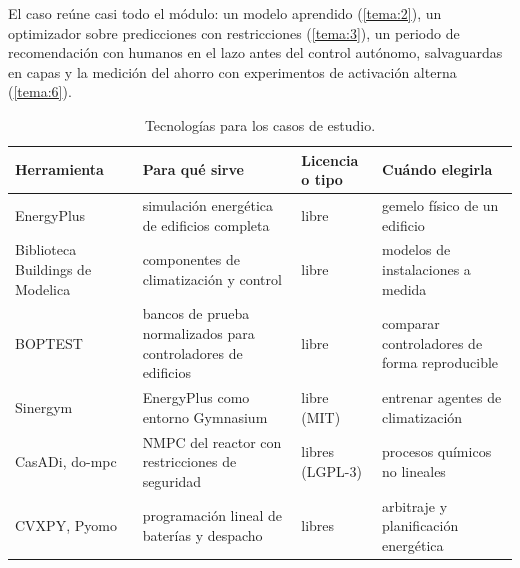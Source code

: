 El caso reúne casi todo el módulo: un modelo aprendido (\cref{tema:2}), un optimizador sobre predicciones con restricciones (\cref{tema:3}), un periodo de recomendación con humanos en el lazo antes del control autónomo, salvaguardas en capas y la medición del ahorro con experimentos de activación alterna (\cref{tema:6}).

\begin{table}[htbp]
\centering\footnotesize
\begin{tabularx}{\textwidth}{@{}>{\raggedright\arraybackslash}p{3.1cm}>{\raggedright\arraybackslash}X>{\raggedright\arraybackslash}p{2.0cm}>{\raggedright\arraybackslash}X@{}}
\toprule
Herramienta & Para qué sirve & Licencia o tipo & Cuándo elegirla \\
\midrule
EnergyPlus~\cite{crawley} & simulación energética de edificios completa & libre & gemelo físico de un edificio \\
Biblioteca Buildings de Modelica~\cite{modelica} & componentes de climatización y control & libre & modelos de instalaciones a medida \\
BOPTEST~\cite{boptest} & bancos de prueba normalizados para controladores de edificios & libre & comparar controladores de forma reproducible \\
Sinergym~\cite{sinergym} & EnergyPlus como entorno Gymnasium & libre (MIT) & entrenar agentes de climatización \\
CasADi, do-mpc~\cite{casadi,dompc} & NMPC del reactor con restricciones de seguridad & libres (LGPL-3) & procesos químicos no lineales \\
CVXPY, Pyomo & programación lineal de baterías y despacho & libres & arbitraje y planificación energética \\
\bottomrule
\end{tabularx}
\caption{Tecnologías para los casos de estudio.}
\label{tab:tec5}
\end{table}

\addtocounter{definicion}{1}%

